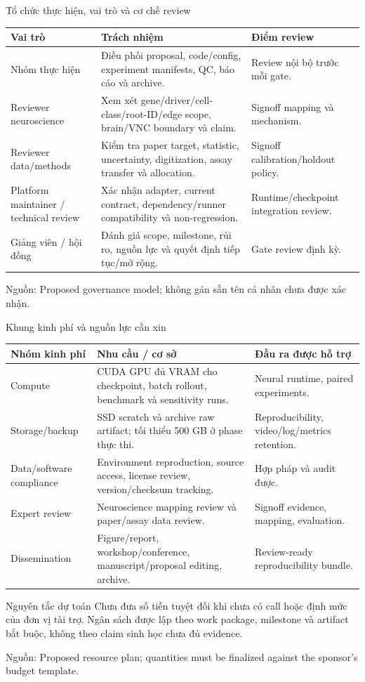 \documentclass[10pt,aspectratio=169]{beamer}
\newcommand{\source}[1]{\par\vfill{\fontsize{6.0}{7}\selectfont\color{gray}Nguồn: #1\par}}
\newcommand{\smallgap}{\vspace{0.18cm}}
\begin{document}
\begin{frame}{Tổ chức thực hiện, vai trò và cơ chế review}
\renewcommand{\arraystretch}{1.22}\small
\begin{tabular}{@{}L{3.3cm}L{6.0cm}L{4.4cm}@{}}
\toprule
\textbf{Vai trò} & \textbf{Trách nhiệm} & \textbf{Điểm review}\\\midrule
Nhóm thực hiện & Điều phối proposal, code/config, experiment manifests, QC, báo cáo và archive. & Review nội bộ trước mỗi gate.\\
Reviewer neuroscience & Xem xét gene/driver/cell-class/root-ID/edge scope, brain/VNC boundary và claim. & Signoff mapping và mechanism.\\
Reviewer data/methods & Kiểm tra paper target, statistic, uncertainty, digitization, assay transfer và allocation. & Signoff calibration/holdout policy.\\
Platform maintainer / technical review & Xác nhận adapter, current contract, dependency/runner compatibility và non-regression. & Runtime/checkpoint integration review.\\
Giảng viên / hội đồng & Đánh giá scope, milestone, rủi ro, nguồn lực và quyết định tiếp tục/mở rộng. & Gate review định kỳ.\\\bottomrule
\end{tabular}
\source{Proposed governance model; không gán sẵn tên cá nhân chưa được xác nhận.}
\end{frame}

\begin{frame}{Khung kinh phí và nguồn lực cần xin}
\renewcommand{\arraystretch}{1.22}\small
\begin{tabular}{@{}L{3.1cm}L{6.6cm}L{4.0cm}@{}}
\toprule
\textbf{Nhóm kinh phí} & \textbf{Nhu cầu / cơ sở} & \textbf{Đầu ra được hỗ trợ}\\\midrule
Compute & CUDA GPU đủ VRAM cho checkpoint, batch rollout, benchmark và sensitivity runs. & Neural runtime, paired experiments.\\
Storage/backup & SSD scratch và archive raw artifact; tối thiểu 500 GB ở phase thực thi. & Reproducibility, video/log/metrics retention.\\
Data/software compliance & Environment reproduction, source access, license review, version/checksum tracking. & Hợp pháp và audit được.\\
Expert review & Neuroscience mapping review và paper/assay data review. & Signoff evidence, mapping, evaluation.\\
Dissemination & Figure/report, workshop/conference, manuscript/proposal editing, archive. & Review-ready reproducibility bundle.\\\bottomrule
\end{tabular}
\smallgap
\begin{block}{Nguyên tắc dự toán}
\scriptsize Chưa đưa số tiền tuyệt đối khi chưa có call hoặc định mức của đơn vị tài trợ. Ngân sách được lập theo work package, milestone và artifact bắt buộc, không theo claim sinh học chưa đủ evidence.
\end{block}
\source{Proposed resource plan; quantities must be finalized against the sponsor's budget template.}
\end{frame}
\end{document}

